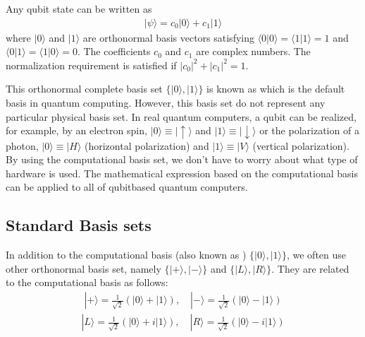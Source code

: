 \documentclass[letterpaper,10pt,english]{jupyterBook}
\begin{document}
\sphinxAtStartPar
Any qubit state can be written as
\begin{equation}\label{equation:qubit/purestates:qubit-purestate}
\begin{split}
| \psi \rangle = c_0 | 0 \rangle + c_1 | 1 \rangle
\end{split}
\end{equation}
\sphinxAtStartPar
where \(| 0 \rangle \) and \(| 1 \rangle\) are orthonormal basis vectors satisfying \(\langle 0 | 0 \rangle = \langle 1 | 1 \rangle = 1\) and \(\langle 0 | 1 \rangle = \langle 1 | 0 \rangle = 0\).  The coefficients \(c_0\) and \(c_1\) are complex numbers. The normalization requirement is satisfied if \(|c_0|^2 + |c_1|^2 = 1\).

\sphinxAtStartPar
This orthonormal complete basis set \(\{|0\rangle, |1\rangle\}\) is known as  which is the default basis in quantum computing.  However, this basis set do not represent any particular physical basis set.  In real quantum computers,  a qubit can be realized, for example, by an electron spin, \(|0\rangle \equiv | \uparrow \rangle\) and \(|1\rangle \equiv |\downarrow \rangle\) or the polarization of a photon, \(|0\rangle \equiv | H \rangle\) (horizontal polarization) and \(|1\rangle \equiv | V \rangle\) (vertical polarization).  By using the computational basis set, we don’t have to worry about what type of hardware is used.  The mathematical expression based on the computational basis can be applied to all of qubit\sphinxhyphen{}based quantum computers.


\subsection{Standard Basis sets}
\label{\detokenize{qubit/purestates:standard-basis-sets}}
\sphinxAtStartPar
In addition to the computational basis (also known as ) \(\{|0\rangle,|1\rangle\}\), we often use other orthonormal basis set, namely  \(\{|+\rangle, |-\rangle\}\) and  \(\{|L\rangle,|R\rangle\}\).
They are related to the computational basis as follows:
\begin{equation}\label{equation:qubit/purestates:XBasis}
\begin{split}
|+\rangle = \frac{1}{\sqrt{2}}\left(|0\rangle + |1\rangle\right), \quad
|-\rangle = \frac{1}{\sqrt{2}}\left(|0\rangle - |1\rangle\right)
\end{split}
\end{equation}\begin{equation}\label{equation:qubit/purestates:YBasis}
\begin{split}
|L\rangle = \frac{1}{\sqrt{2}}\left(|0\rangle + i |1\rangle\right), \quad
|R\rangle = \frac{1}{\sqrt{2}}\left(|0\rangle - i |1\rangle\right)
\end{split}
\end{equation}
\end{document}
